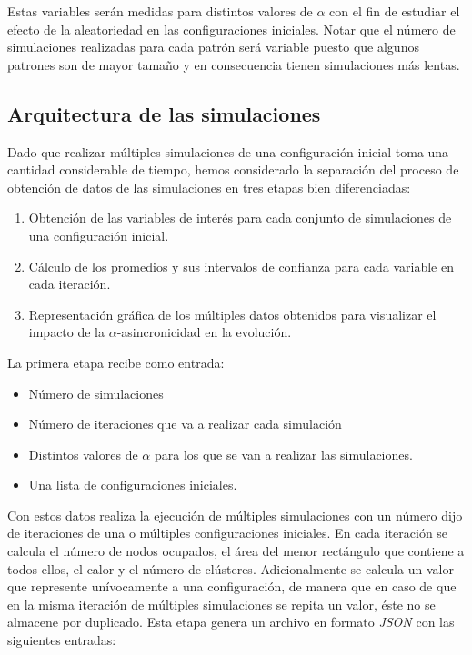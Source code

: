\documentclass[../proyecto.tex]{memoir}
\begin{document}
Estas variables serán medidas para distintos valores de $\alpha$ con el fin de estudiar el efecto de la aleatoriedad en las configuraciones iniciales. Notar que el número de simulaciones realizadas para cada patrón será variable puesto que algunos patrones son de mayor tamaño y en consecuencia tienen simulaciones más lentas.

\subsection{Arquitectura de las simulaciones}

Dado que realizar múltiples simulaciones de una configuración inicial toma una cantidad considerable de tiempo, hemos considerado la separación del proceso de obtención de datos de las simulaciones en tres etapas bien diferenciadas:
\begin{enumerate}
\item Obtención de las variables de interés para cada conjunto de simulaciones de una configuración inicial.
\item Cálculo de los promedios y sus intervalos de confianza para cada variable en cada iteración. %
\item Representación gráfica de los múltiples datos obtenidos para visualizar el impacto de la $\alpha$-asincronicidad en la evolución.
\end{enumerate}

La primera etapa recibe como entrada: \begin{itemize}
\item Número de simulaciones
\item Número de iteraciones que va a realizar cada simulación
\item Distintos valores de $\alpha$ para los que se van a realizar las simulaciones.
\item Una lista de configuraciones iniciales.
\end{itemize}

Con estos datos realiza la ejecución de múltiples simulaciones con un número dijo de iteraciones de una o múltiples configuraciones iniciales. En cada iteración se calcula el número de nodos ocupados, el área del menor rectángulo que contiene a todos ellos, el calor y el número de clústeres. Adicionalmente se calcula un valor que represente unívocamente a una configuración, de manera que en caso de que en la misma iteración de múltiples simulaciones se repita un valor, éste no se almacene por duplicado. Esta etapa genera un archivo en formato \textit{JSON} \cite{json} con las siguientes entradas:
\end{document}
